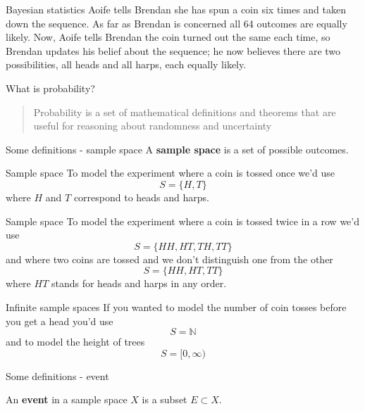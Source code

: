 \documentclass{beamer}
\newcommand{\crish}{\color{reddish}}
\newcommand{\cbla}{\color{black}}
\newcommand{\cred}{\color{red}}
\newcommand{\cblu}{\color{blue}}
\begin{document}
\begin{frame}{Bayesian statistics}
  \cred{}Aoife\cbla{}  tells \cblu{}Brendan\cbla{}  she has spun a coin six times and taken down the
  sequence. As far as \cblu{}Brendan\cbla{}  is concerned all 64 outcomes are equally
  likely. Now, \cred{}Aoife\cbla{}  tells \cblu{}Brendan\cbla{}  the coin turned out the same each
  time, so \cblu{}Brendan\cbla{}  updates his belief about the sequence; he now
  believes there are two possibilities, all heads and all harps, each
  equally likely.
\end{frame}


\begin{frame}{What is probability?}
  \begin{quote}
    Probability is a set of mathematical definitions and theorems that
    are useful for reasoning about randomness and uncertainty
  \end{quote}
\end{frame}

\begin{frame}{Some definitions - sample space}
  A \textbf{sample space} is a set of possible outcomes. 
\end{frame}

\begin{frame}{Sample space}
  To model the experiment where a coin is tossed once we'd use
  \crish$$S=\{H,T\}$$\cbla{}
  where \crish$H$\cbla{} and \crish$T$\cbla{} correspond to heads and harps.
\end{frame}


\begin{frame}{Sample space}
  To model the experiment where a coin is tossed twice in a row we'd use
  \crish$$S=\{HH,HT,TH,TT\}$$\cbla{}
  and where two coins are tossed and we don't distinguish one from the other
  \crish$$S=\{HH,HT,TT\}$$\cbla{}
  where \crish$HT$\cbla{} stands for heads and harps in any order.
\end{frame}

\begin{frame}{Infinite sample spaces}
  If you wanted to model the number of coin tosses before you get a head you'd use
  \crish$$S=\mathbb{N}$$\cbla{}
  and to model the height of trees
  \crish$$S=[0,\infty)$$\cbla{}
\end{frame}

\begin{frame}{Some definitions - event}

  An \textbf{event} in a sample space \crish$X$\cbla{} is a subset \crish$E\subset X$\cbla{}.

\end{frame}
\end{document}
